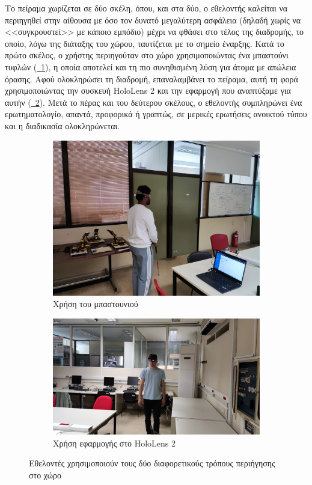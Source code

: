Το πείραμα χωρίζεται σε δύο σκέλη, όπου, και στα δύο, ο εθελοντής καλείται να περιηγηθεί στην αίθουσα με όσο τον δυνατό μεγαλύτερη ασφάλεια (δηλαδή χωρίς να <<συγκρουστεί>> με κάποιο εμπόδιο) μέχρι να φθάσει στο τέλος της διαδρομής, το οποίο, λόγω της διάταξης του χώρου, ταυτίζεται με το σημείο έναρξης. Κατά το πρώτο σκέλος, ο χρήστης περιηγούταν στο χώρο χρησιμοποιώντας ένα μπαστούνι τυφλών (\hyperref[fig:experimentCane]{\schema~\ref*{fig:experimentCane}}), η οποία αποτελεί και τη πιο συνηθισμένη λύση για άτομα με απώλεια όρασης. Αφού ολοκληρώσει τη διαδρομή, επαναλαμβάνει το πείραμα, αυτή τη φορά χρησιμοποιώντας την συσκευή HoloLens 2 και την εφαρμογή που αναπτύξαμε για αυτήν (\hyperref[fig:experimentHololens]{\schema~\ref*{fig:experimentHololens}}). Μετά το πέρας και του δεύτερου σκέλους, ο εθελοντής συμπληρώνει ένα ερωτηματολογίο, απαντά, προφορικά ή γραπτώς, σε μερικές ερωτήσεις ανοικτού τύπου και η διαδικασία ολοκληρώνεται.

\begin{figure}[!h]
  \centering
  \begin{subfigure}{0.5\textwidth}
    \centering
    \includegraphics[width=0.7\linewidth]{images/experimentCane.jpg}
    \caption{Χρήση του μπαστουνιού}\label{fig:experimentCane}
  \end{subfigure}%
  \begin{subfigure}{0.5\textwidth}
    \centering
    \includegraphics[width=0.9\linewidth]{images/experimentHololens.jpg}
    \caption{Χρήση εφαρμογής στο HoloLens 2}\label{fig:experimentHololens}
  \end{subfigure}%
  \caption{Εθελοντές χρησιμοποιούν τους δύο διαφορετικούς τρόπους περιήγησης στο χώρο}\label{fig:experimentNavMethods}
\end{figure}

